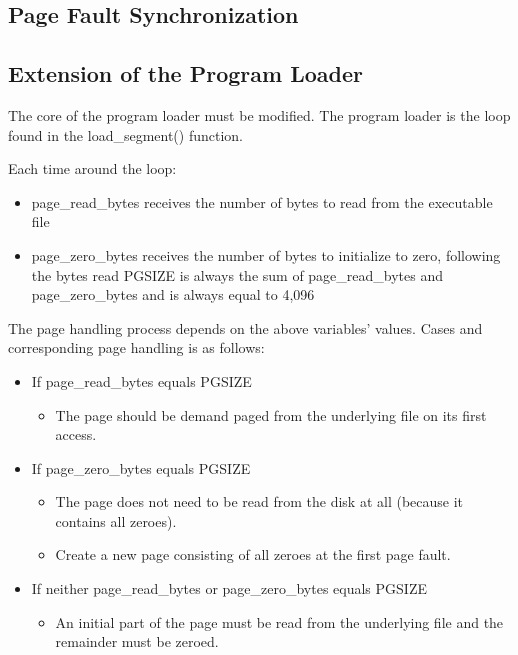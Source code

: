 \documentclass[11pt, letterpaper]{article}
\begin{document}
\subsection{Page Fault Synchronization}

\subsection{Extension of the Program Loader}
The core of the program loader must be modified. The program loader is the loop found in the load\_segment() function. 

Each time around the loop:
\begin{itemize}
\item page\_read\_bytes receives the number of bytes to read from the executable file
\item page\_zero\_bytes receives the number of bytes to initialize to zero, following the bytes read
PGSIZE is always the sum of page\_read\_bytes and page\_zero\_bytes and is always equal to 4,096 
\end{itemize}

    The page handling process depends on the above variables’ values. Cases and 
corresponding page handling is as follows:

\begin{itemize}
\item If page\_read\_bytes equals PGSIZE
	\begin{itemize}
		\item The page should be demand paged from the underlying file on its first access.
	\end{itemize}
\item If page\_zero\_bytes equals PGSIZE
	\begin{itemize}
		\item The page does not need to be read from the disk at all (because it contains all zeroes).
		\item Create a new page consisting of all zeroes at the first page fault.
	\end{itemize}
\item If neither page\_read\_bytes or page\_zero\_bytes equals PGSIZE
	\begin{itemize}
		\item An initial part of the page must be read from the underlying file and the remainder must be 				  zeroed.
	\end{itemize}
\end{itemize}
\end{document}
